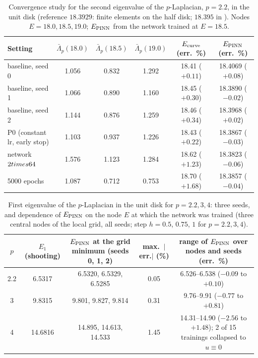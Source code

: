 \begin{table}[ht]
\centering
\begin{tabular}{lccccc}
\toprule
Setting & $\bar\Lambda_p(18.0)$ & $\bar\Lambda_p(18.5)$ & $\bar\Lambda_p(19.0)$ & $E_{\rm curve}$ (err.\ \%) & $E_{\rm PINN}$ (err.\ \%) \\
\midrule
baseline, seed 0 & 1.056 & 0.832 & 1.292 & 18.41 ($+0.11$) & 18.4069 ($+0.08$) \\
baseline, seed 1 & 1.066 & 0.890 & 1.160 & 18.45 ($+0.30$) & 18.3890 ($-0.02$) \\
baseline, seed 2 & 1.144 & 0.876 & 1.259 & 18.46 ($+0.34$) & 18.3968 ($+0.02$) \\
P0 (constant lr, early stop) & 1.103 & 0.937 & 1.226 & 18.43 ($+0.22$) & 18.3867 ($-0.03$) \\
network $2\\times64$ & 1.576 & 1.123 & 1.284 & 18.62 ($+1.23$) & 18.3823 ($-0.06$) \\
5000 epochs & 1.087 & 0.712 & 0.753 & 18.70 ($+1.68$) & 18.3857 ($-0.04$) \\
\bottomrule
\end{tabular}
\caption{Convergence study for the second eigenvalue of the $p$-Laplacian, $p=2.2$, in the unit disk (reference $18.3929$: finite elements on the half disk; $18.395$ in \cite{HJ11}). Nodes $E=18.0,18.5,19.0$; $E_{\rm PINN}$ from the network trained at $E=18.5$.}
\label{tab.plap.conv2}
\end{table}

\begin{table}[ht]
\centering
\begin{tabular}{ccccc}
\toprule
$p$ & $E_1$ (shooting) & $E_{\rm PINN}$ at the grid minimum (seeds 0, 1, 2) & max.\ $|$err.$|$ (\%) & range of $E_{\rm PINN}$ over nodes and seeds (err.\ \%) \\
\midrule
2.2 & 6.5317 & 6.5320, 6.5329, 6.5285 & 0.05 & 6.526--6.538 ($-0.09$ to $+0.10$) \\
3 & 9.8315 & 9.801, 9.827, 9.814 & 0.31 & 9.76--9.91 ($-0.77$ to $+0.81$) \\
4 & 14.6816 & 14.895, 14.613, 14.533 & 1.45 & 14.31--14.90 ($-2.56$ to $+1.48$); 2 of 15 trainings collapsed to $u\equiv0$ \\
\bottomrule
\end{tabular}
\caption{First eigenvalue of the $p$-Laplacian in the unit disk for $p=2.2,3,4$: three seeds, and dependence of $E_{\rm PINN}$ on the node $E$ at which the network was trained (three central nodes of the local grid, all seeds; step $h=0.5$, $0.75$, $1$ for $p=2.2,3,4$).}
\label{tab.plap.p.seeds}
\end{table}

